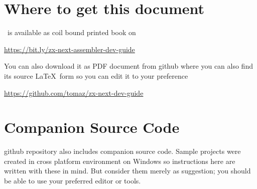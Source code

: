 \documentclass[12pt,twoside,openright,a4paper]{book}
\begin{document}
\minitoc


\section{Where to get this document}

\BookTitle ~is available as coil bound printed book on

\url{https://bit.ly/zx-next-assembler-dev-guide}

You can also download it as PDF document from github where you can also find its source \LaTeX ~form so you can edit it to your preference

\url{https://github.com/tomaz/zx-next-dev-guide}


\section{Companion Source Code}

github repository also includes companion source code. Sample projects were created in cross platform environment on Windows so instructions here are written with these in mind. But consider them merely as suggestion; you should be able to use your preferred editor or tools.
\end{document}
